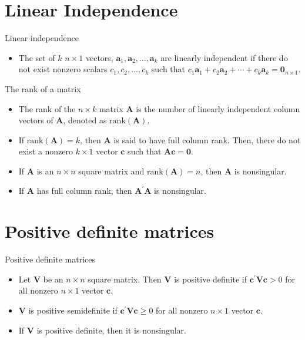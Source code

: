 \documentclass[presentation]{beamer}
\begin{document}
\section{Linear Independence}
\label{sec:orgfc3910a}

\begin{frame}[label={sec:org42f7af3}]{Linear independence}
\begin{itemize}
\item The set of \(k\) \(n \times 1\) vectors, \(\mathbf{a}_1, \mathbf{a}_2,
  \ldots, \mathbf{a}_k\) are \alert{linearly independent} if there do not exist
nonzero scalars \(c_1, c_2, \ldots, c_k\) such that \(c_1 \mathbf{a}_1 +
  c_2 \mathbf{a}_2 + \cdots + c_k \mathbf{a}_k = \mathbf{0}_{n \times
  1}\).
\end{itemize}
\end{frame}

\begin{frame}[label={sec:orgc8835a4}]{The rank of a matrix}
\begin{itemize}
\item The \alert{rank} of the \(n \times k\) matrix \(\mathbf{A}\) is the number of
linearly independent column vectors of \(\mathbf{A}\), denoted as
\(\mathrm{rank}(\mathbf{A})\).

\item If \(\mathrm{rank}(\mathbf{A}) = k\), then \(\mathbf{A}\) is said to
have full column rank. Then, there do not exist a nonzero \(k \times
  1\) vector \(\mathbf{c}\) such that \(\mathbf{A} \mathbf{c} =
  \mathbf{0}\).

\item If \(\mathbf{A}\) is an \(n \times n\) square matrix and
\(\mathrm{rank}(\mathbf{A}) = n\), then \(\mathbf{A}\) is nonsingular.

\item If \(\mathbf{A}\) has full column rank, then \(\mathbf{A}^{\prime}
  \mathbf{A}\) is nonsingular.
\end{itemize}
\end{frame}


\section{Positive definite matrices}
\label{sec:orgf560466}

\begin{frame}[label={sec:orgef1c5a2}]{Positive definite matrices}
\begin{itemize}
\item Let \(\mathbf{V}\) be an \(n \times n\) square matrix. Then \(\mathbf{V}\)
is \alert{positive definite} if 
\(\mathbf{c}^{\prime} \mathbf{V} \mathbf{c} > 0\) 
for all nonzero \(n \times 1\) vector \(\mathbf{c}\).

\item \(\mathbf{V}\)
is \alert{positive semidefinite} if 
\(\mathbf{c}^{\prime} \mathbf{V} \mathbf{c} \geq 0\) for all nonzero 
\(n \times 1\) vector \(\mathbf{c}\).

\item If \(\mathbf{V}\) is positive definite, then it is nonsingular.
\end{itemize}
\end{frame}
\end{document}
